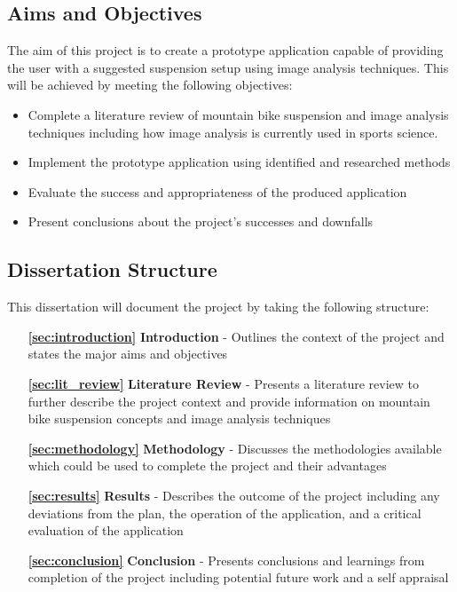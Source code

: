 \subsection{Aims and Objectives}\label{sec:aims_and_objectives}
	The aim of this project is to create a prototype application capable of providing the user with a suggested suspension setup using image analysis techniques. This will be achieved by meeting the following objectives:
	\begin{itemize}
		\item Complete a literature review of mountain bike suspension and image analysis techniques including how image analysis is currently used in sports science.
		\item Implement the prototype application using identified and researched methods
		\item Evaluate the success and appropriateness of the produced application
		\item Present conclusions about the project's successes and downfalls
	\end{itemize}
\subsection{Dissertation Structure}
	This dissertation will document the project by taking the following structure:
	\begin{itemize}
		\item[\bfseries \ref{sec:introduction}] {\bfseries Introduction} - Outlines the context of the project and states the major aims and objectives
		\item[\bfseries \ref{sec:lit_review}]{\bfseries Literature Review} - Presents a literature review to further describe the project context and provide information on mountain bike suspension concepts and image analysis techniques
		\item[\bfseries \ref{sec:methodology}] {\bfseries Methodology} - Discusses the methodologies available which could be used to complete the project and their advantages
		\item[\bfseries \ref{sec:results}] {\bfseries Results} - Describes the outcome of the project including any deviations from the plan, the operation of the application, and a critical evaluation of the application
		\item[\bfseries \ref{sec:conclusion}] {\bfseries Conclusion} - Presents conclusions and learnings from completion of the project including potential future work and a self appraisal
	\end{itemize}
	